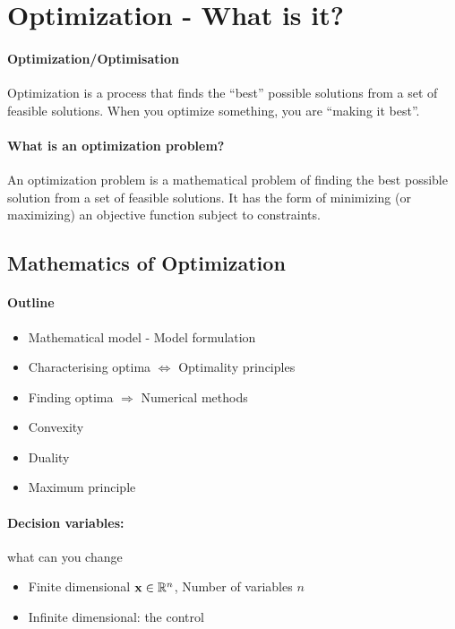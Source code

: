 \section{Optimization - What is it?}

\paragraph{Optimization/Optimisation}
Optimization is a process that finds the ``best'' possible solutions from a set of feasible solutions. When you optimize something, you are ``making it best''.

\paragraph{What is an optimization problem?}
An optimization problem is a mathematical problem of finding the best possible solution from a set of feasible solutions. It has the form of minimizing (or maximizing) an objective function subject to constraints.

\subsection{Mathematics of Optimization}

\paragraph{Outline}
\begin{itemize}
    \item Mathematical model - Model formulation
    \item Characterising optima \(\iff\) Optimality principles
    \item Finding optima \(\Rightarrow\) Numerical methods
    \item Convexity
    \item Duality
    \item Maximum principle
\end{itemize}

\paragraph{Decision variables:}
what can you change
\begin{itemize}
    \item Finite dimensional \(\mathbf{x} \in \mathbb{R}^n\), Number of variables \(n\)
    \item Infinite dimensional: the control
\end{itemize}

